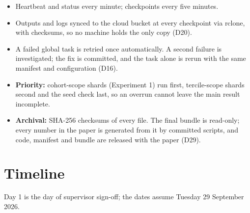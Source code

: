 \documentclass[11pt,a4paper]{article}
\begin{document}
\begin{itemize}
  \item Heartbeat and status every minute; checkpoints every five minutes.
  \item Outputs and logs synced to the cloud bucket at every checkpoint via rclone, with checksums,
  so no machine holds the only copy (D20).
  \item A failed global task is retried once automatically. A second failure is investigated; the
  fix is committed, and the task alone is rerun with the same manifest and configuration (D16).
  \item \textbf{Priority:} cohort-scope shards (Experiment 1) run first, tercile-scope shards
  second and the seed check last, so an overrun cannot leave the main result incomplete.
  \item \textbf{Archival:} SHA-256 checksums of every file. The final bundle is read-only; every
  number in the paper is generated from it by committed scripts, and code, manifest and bundle are
  released with the paper (D29).
\end{itemize}

\section{Timeline}\label{sec:timeline}

Day 1 is the day of supervisor sign-off; the dates assume Tuesday 29 September 2026.
\end{document}
